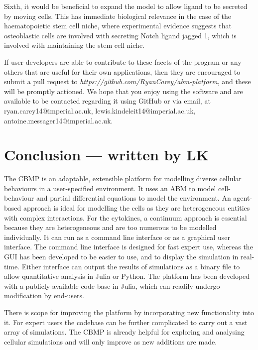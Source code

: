 \documentclass[12pt]{article}
\begin{document}
Sixth, it would be beneficial to expand the model to allow ligand to be 
secreted by moving cells. This has immediate biological relevance in the 
case of the haematopoietic stem cell niche, where experimental evidence 
suggests that osteoblastic cells are involved with secreting Notch 
ligand jagged 1, which is involved with maintaining the stem cell niche.
\cite{roeder06}

If user-developers are able to contribute to these facets of the program 
or any others that are useful for their own applications, then they are 
encouraged to submit a pull request to {\itshape 
https://github.com/RyanCarey/abm-platform}, and these will be
promptly actioned. We hope that you enjoy using the software 
and are available to be contacted regarding it using GitHub or via 
email, at ryan.carey14@imperial.ac.uk, 
lewis.kindeleit14@imperial.ac.uk, 
antoine.messager14@imperial.ac.uk.

\section{Conclusion --- written by LK}
The CBMP is an adaptable, extensible platform for modelling diverse cellular behaviours in a user-specified 
environment. It uses an ABM to model cell-behaviour and partial differential equations to model the environment. 
An agent-based approach is ideal for modelling the cells as they are heterogeneous entities with complex 
interactions. For the cytokines, a continuum approach is essential because they are heterogeneous and 
are too numerous to be modelled individually. It can run as a command line interface or as a graphical 
user interface. The command line interface is designed for fast expert use, whereas the GUI has been 
developed to be easier to use, and to display the simulation in real-time. Either interface can output 
the results of simulations as a binary file to allow quantitative analysis in Julia or Python. The platform 
has been developed with a publicly available code-base in Julia, which can readily undergo modification 
by end-users.

There is scope for improving the platform by incorporating new functionality into it. For expert users 
the codebase can be further complicated to carry out a vast array of simulations. The CBMP is already 
helpful for exploring and analysing cellular simulations and will only improve as new additions are made. 

\newpage
\end{document}
